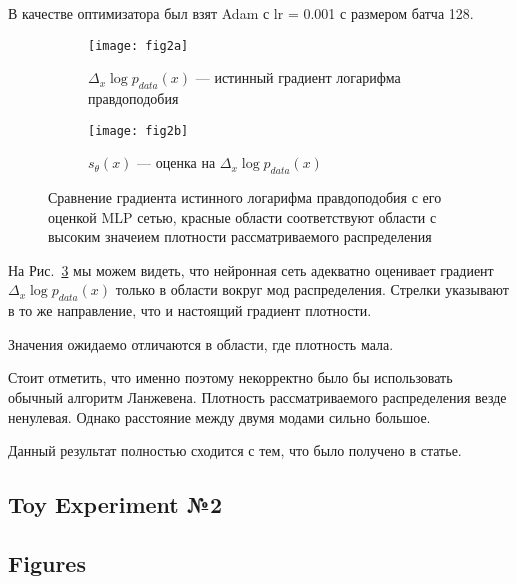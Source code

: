 \documentclass{article}
\begin{document}
В качестве оптимизатора был взят Adam с lr = 0.001 с размером батча 128. 

\begin{figure}[H]
  \centering
  \begin{subfigure}[b]{0.45\textwidth}
  	\texttt{[image: fig2a]}
  	\caption{$\Delta_x \log p_{data}(x)$ --- истинный градиент логарифма правдоподобия}
  	\label{fig:2a}
  \end{subfigure}
  \begin{subfigure}[b]{0.45\textwidth}
    \centering
    \texttt{[image: fig2b]}
    \caption{$s_{\theta}(x)$ --- оценка на $\Delta_x \log p_{data}(x)$}
    \label{fig:2b}
  \end{subfigure}
  \caption{Сравнение градиента истинного логарифма правдоподобия с его оценкой
  MLP сетью, красные области соответствуют области с высоким значеием плотности
  рассматриваемого распределения}
  \label{fig:2}
\end{figure}

На Рис.~\ref{fig:2} мы можем видеть, что нейронная сеть адекватно оценивает
градиент $\Delta_x \log p_{data}(x)$ только в области вокруг мод распределения.
Стрелки указывают в то же направление, что и настоящий градиент плотности.

Значения ожидаемо отличаются в области, где плотность мала.

Стоит отметить, что именно поэтому некорректно было бы использовать обычный
алгоритм Ланжевена. Плотность рассматриваемого распределения везде ненулевая.
Однако расстояние между двумя модами сильно большое.

Данный результат полностью сходится с тем, что было получено в статье.

\subsection{Toy Experiment №2}










\subsection{Figures}

\end{document}
